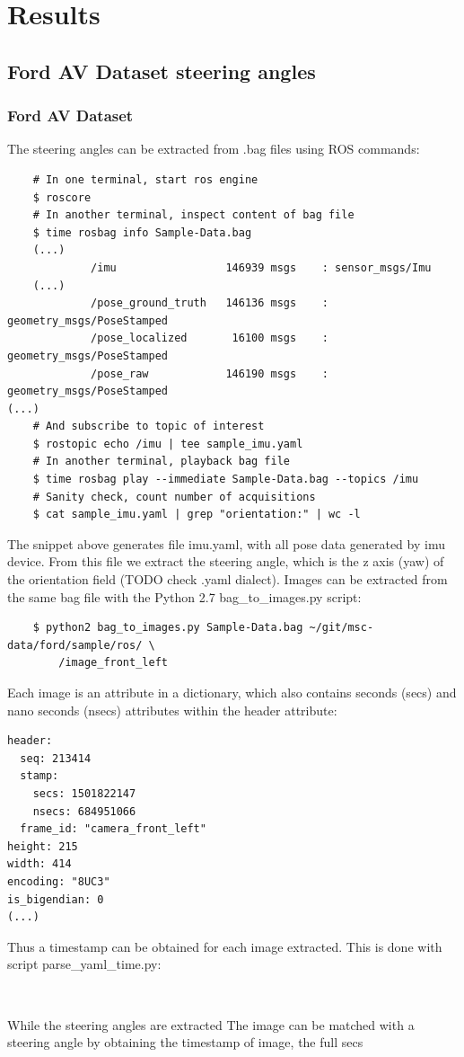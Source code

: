 \chapter{Results} %

\label{AppendixD} %

\section{Ford AV Dataset steering angles}

\subsection{Ford AV Dataset}

The steering angles can be extracted from .bag files using ROS commands:
\begin{verbatim}
    # In one terminal, start ros engine
    $ roscore
    # In another terminal, inspect content of bag file
    $ time rosbag info Sample-Data.bag
    (...)
             /imu                 146939 msgs    : sensor_msgs/Imu             
    (...)
             /pose_ground_truth   146136 msgs    : geometry_msgs/PoseStamped   
             /pose_localized       16100 msgs    : geometry_msgs/PoseStamped   
             /pose_raw            146190 msgs    : geometry_msgs/PoseStamped   
(...)
    # And subscribe to topic of interest 
    $ rostopic echo /imu | tee sample_imu.yaml
    # In another terminal, playback bag file
    $ time rosbag play --immediate Sample-Data.bag --topics /imu
    # Sanity check, count number of acquisitions
    $ cat sample_imu.yaml | grep "orientation:" | wc -l
\end{verbatim}
The snippet above generates file imu.yaml, with all pose data generated by imu device. From this file we extract the steering angle, which is the z axis (yaw) of the orientation field (TODO check .yaml dialect). 
Images can be extracted from the same bag file with the Python 2.7 bag\_to\_images.py script:
\begin{verbatim}
    $ python2 bag_to_images.py Sample-Data.bag ~/git/msc-data/ford/sample/ros/ \
        /image_front_left
\end{verbatim}
Each image is an attribute in a dictionary, which also contains seconds (secs) and nano seconds (nsecs) attributes within the header attribute:
\begin{verbatim}
header: 
  seq: 213414
  stamp: 
    secs: 1501822147
    nsecs: 684951066
  frame_id: "camera_front_left"
height: 215
width: 414
encoding: "8UC3"
is_bigendian: 0
(...)
\end{verbatim}
Thus a timestamp can be obtained for each image extracted. This is done with script parse\_yaml\_time.py:
\begin{verbatim}
    
\end{verbatim}
While the steering angles are extracted 
The image can be matched with a steering angle by obtaining the timestamp of image, the full secs 

